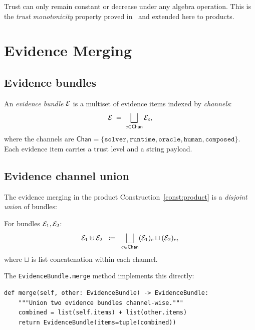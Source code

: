 \documentclass[11pt]{article}
\newcommand{\eqdef}{\;\coloneqq\;}                %
\begin{document}
\begin{remark}
Trust can only remain constant or decrease under any algebra operation.
This is the \emph{trust monotonicity} property proved
in~\cite{jugeo02,jugeo04} and extended here to products.
\end{remark}

\section{Evidence Merging}\label{sec:evidence}

\subsection{Evidence bundles}

An \emph{evidence bundle} $\mathcal{E}$ is a multiset of evidence items
indexed by \emph{channels}:
\[
  \mathcal{E} \;=\; \bigsqcup_{c \in \mathsf{Chan}} \mathcal{E}_c,
\]
where the channels are $\mathsf{Chan} = \{\texttt{solver}, \texttt{runtime},
\texttt{oracle}, \texttt{human}, \texttt{composed}\}$.  Each evidence
item carries a trust level and a string payload.

\subsection{Evidence channel union}

The evidence merging in the product Construction~\ref{const:product}
is a \emph{disjoint union} of bundles:

\begin{definition}\label{def:evid-merge}
For bundles $\mathcal{E}_1, \mathcal{E}_2$:
\[
  \evid_1 \uplus \evid_2
  \;\eqdef\;
  \bigsqcup_{c \in \mathsf{Chan}} (\evid_1)_c \sqcup (\evid_2)_c,
\]
where $\sqcup$ is list concatenation within each channel.
\end{definition}

The \texttt{EvidenceBundle.merge} method implements this directly:

\begin{lstlisting}[style=jugeo-python, caption={EvidenceBundle.merge
  (from \texttt{judgment\_terms.py}).},
  label=lst:evid-merge]
def merge(self, other: EvidenceBundle) -> EvidenceBundle:
    """Union two evidence bundles channel-wise."""
    combined = list(self.items) + list(other.items)
    return EvidenceBundle(items=tuple(combined))
\end{lstlisting}
\end{document}
